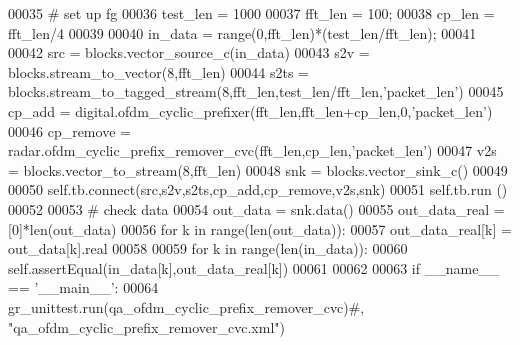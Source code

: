 \begin{DoxyCode}
00035         \textcolor{comment}{# set up fg}
00036         test\_len = 1000
00037         fft\_len = 100;
00038         cp\_len = fft\_len/4
00039         
00040         in\_data = range(0,fft\_len)*(test\_len/fft\_len);
00041         
00042         src = blocks.vector\_source\_c(in\_data)
00043         s2v = blocks.stream\_to\_vector(8,fft\_len)
00044         s2ts = blocks.stream\_to\_tagged\_stream(8,fft\_len,test\_len/fft\_len,\textcolor{stringliteral}{'packet\_len'})
00045         cp\_add = digital.ofdm\_cyclic\_prefixer(fft\_len,fft\_len+cp\_len,0,\textcolor{stringliteral}{'packet\_len'})
00046         cp\_remove = radar.ofdm\_cyclic\_prefix\_remover\_cvc(fft\_len,cp\_len,\textcolor{stringliteral}{'packet\_len'})
00047         v2s = blocks.vector\_to\_stream(8,fft\_len)
00048         snk = blocks.vector\_sink\_c()
00049         
00050         self.tb.connect(src,s2v,s2ts,cp\_add,cp\_remove,v2s,snk)
00051         self.tb.run ()
00052         
00053         \textcolor{comment}{# check data}
00054         out\_data = snk.data()
00055         out\_data\_real = [0]*len(out\_data)
00056         \textcolor{keywordflow}{for} k \textcolor{keywordflow}{in} range(len(out\_data)):
00057             out\_data\_real[k] = out\_data[k].real
00058         
00059         \textcolor{keywordflow}{for} k \textcolor{keywordflow}{in} range(len(in\_data)):
00060             self.assertEqual(in\_data[k],out\_data\_real[k])
00061 
00062 
00063 \textcolor{keywordflow}{if} \_\_name\_\_ == \textcolor{stringliteral}{'\_\_main\_\_'}:
00064     gr\_unittest.run(qa\_ofdm\_cyclic\_prefix\_remover\_cvc)\textcolor{comment}{#, "qa\_ofdm\_cyclic\_prefix\_remover\_cvc.xml")}
\end{DoxyCode}

